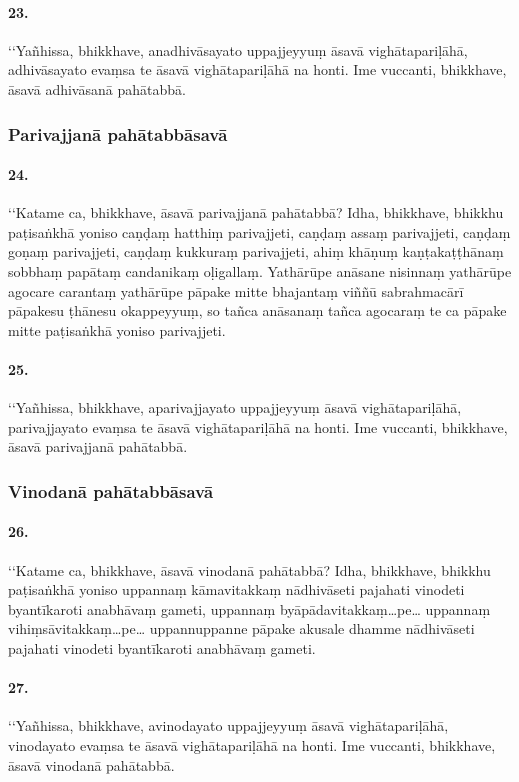 \paragraph{23.} ‘‘Yañhissa, bhikkhave, anadhivāsayato uppajjeyyuṃ āsavā vighātapariḷāhā, adhivāsayato evaṃsa te āsavā vighātapariḷāhā na honti. Ime vuccanti, bhikkhave, āsavā adhivāsanā pahātabbā.

\subsubsection{Parivajjanā pahātabbāsavā}

\paragraph{24.} ‘‘Katame ca, bhikkhave, āsavā parivajjanā pahātabbā? Idha, bhikkhave, bhikkhu paṭisaṅkhā yoniso caṇḍaṃ hatthiṃ parivajjeti, caṇḍaṃ assaṃ parivajjeti, caṇḍaṃ goṇaṃ parivajjeti, caṇḍaṃ kukkuraṃ parivajjeti, ahiṃ khāṇuṃ kaṇṭakaṭṭhānaṃ sobbhaṃ papātaṃ candanikaṃ oḷigallaṃ. Yathārūpe anāsane nisinnaṃ yathārūpe agocare carantaṃ yathārūpe pāpake mitte bhajantaṃ viññū sabrahmacārī pāpakesu ṭhānesu okappeyyuṃ, so tañca anāsanaṃ tañca agocaraṃ te ca pāpake mitte paṭisaṅkhā yoniso parivajjeti.

\paragraph{25.} ‘‘Yañhissa, bhikkhave, aparivajjayato uppajjeyyuṃ āsavā vighātapariḷāhā, parivajjayato evaṃsa te āsavā vighātapariḷāhā na honti. Ime vuccanti, bhikkhave, āsavā parivajjanā pahātabbā.

\subsubsection{Vinodanā pahātabbāsavā}

\paragraph{26.} ‘‘Katame ca, bhikkhave, āsavā vinodanā pahātabbā? Idha, bhikkhave, bhikkhu paṭisaṅkhā yoniso uppannaṃ kāmavitakkaṃ nādhivāseti pajahati vinodeti byantīkaroti anabhāvaṃ gameti, uppannaṃ byāpādavitakkaṃ…pe… uppannaṃ vihiṃsāvitakkaṃ…pe… uppannuppanne pāpake akusale dhamme nādhivāseti pajahati vinodeti byantīkaroti anabhāvaṃ gameti.

\paragraph{27.} ‘‘Yañhissa, bhikkhave, avinodayato uppajjeyyuṃ āsavā vighātapariḷāhā, vinodayato evaṃsa te āsavā vighātapariḷāhā na honti. Ime vuccanti, bhikkhave, āsavā vinodanā pahātabbā.

